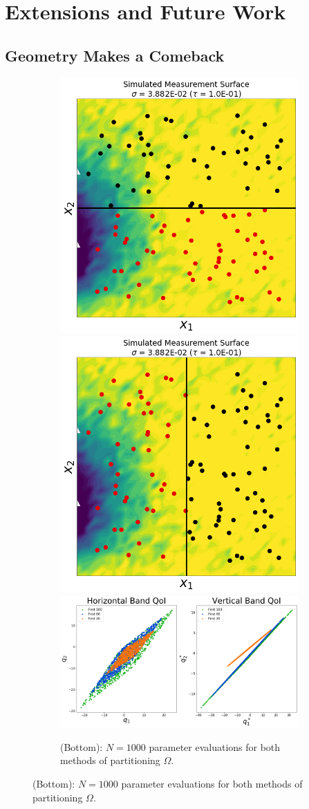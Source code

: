 \section{Extensions and Future Work}


\subsection{Geometry Makes a Comeback}

\begin{frame}[t]
\centering
\begin{figure}
\centering

\begin{figure}
\centering
  \includegraphics[width=0.25\linewidth]{figures/pde-highd_sensors_D2.png}
  \includegraphics[width=0.25\linewidth]{figures/pde-highd_sensors-alt_D2.png}
  \includegraphics[width=0.5\linewidth]{figures/pde-highd_geom_D2.png}
\caption{
(Bottom): $N=1000$ parameter evaluations for both methods of partitioning $\Omega$.
}
\label{fig:pde-highd-2d-geometry}
\end{figure}


\end{figure}

\end{frame}


